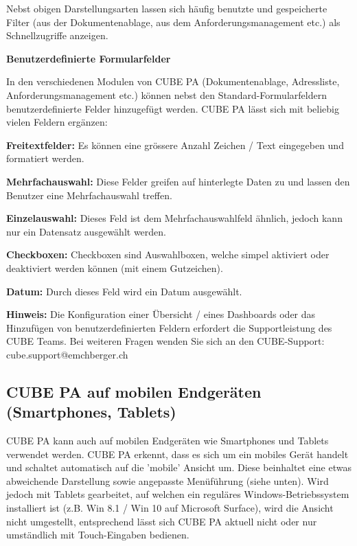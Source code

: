 \vspace{\baselineskip}

Nebst obigen Darstellungsarten lassen sich häufig benutzte und gespeicherte Filter (aus der Dokumentenablage, aus dem Anforderungsmanagement etc.) als Schnellzugriffe anzeigen. 


\pagebreak
\textbf{Benutzerdefinierte Formularfelder}

\vspace{\baselineskip}

In den verschiedenen Modulen von CUBE PA (Dokumentenablage, Adressliste, Anforderungsmanagement etc.) können nebst den Standard-Formularfeldern benutzerdefinierte Felder hinzugefügt werden. CUBE PA lässt sich mit beliebig vielen Feldern ergänzen:

\vspace{\baselineskip}

\begin{compactitem}
	\item \textbf{Freitextfelder:} Es können eine grössere Anzahl Zeichen / Text eingegeben und formatiert werden.
	\item \textbf{Mehrfachauswahl:} Diese Felder greifen auf hinterlegte Daten zu und lassen den Benutzer eine Mehrfachauswahl treffen.
	\item \textbf{Einzelauswahl:} Dieses Feld ist dem Mehrfachauswahlfeld ähnlich, jedoch kann nur ein Datensatz ausgewählt werden. 
	\item \textbf{Checkboxen:} Checkboxen sind Auswahlboxen, welche simpel aktiviert oder deaktiviert werden können (mit einem Gutzeichen).
	\item \textbf{Datum:} Durch dieses Feld wird ein Datum ausgewählt.
\end{compactitem}

\vspace{\baselineskip}

\textbf{Hinweis:} Die Konfiguration einer Übersicht / eines Dashboards oder das Hinzufügen von benutzerdefinierten Feldern erfordert die Supportleistung des CUBE Teams. Bei weiteren Fragen wenden Sie sich an den CUBE-Support: {\color{red} cube.support@emchberger.ch}

\pagebreak
\subsection{CUBE PA auf mobilen Endgeräten (Smartphones, Tablets)}

CUBE PA kann auch auf mobilen Endgeräten wie Smartphones und Tablets verwendet werden. CUBE PA erkennt, dass es sich um ein mobiles Gerät handelt und schaltet automatisch auf die 'mobile' Ansicht um. Diese beinhaltet eine etwas abweichende Darstellung sowie angepasste Menüführung (siehe unten). Wird jedoch mit Tablets gearbeitet, auf welchen ein reguläres Windows-Betriebssystem installiert ist (z.B. Win 8.1 / Win 10 auf Microsoft Surface), wird die Ansicht nicht umgestellt, entsprechend lässt sich CUBE PA aktuell nicht oder nur umständlich mit Touch-Eingaben bedienen.


